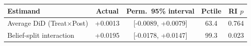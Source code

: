 \begin{tabular}{lcccc}
\toprule
Estimand & Actual & Perm.\ 95\% interval & Pctile & RI $p$ \\
\midrule
Average DiD (Treat$\times$Post) & +0.0013 & [-0.0089, +0.0079] & 63.4 & 0.764 \\
Belief-split interaction & +0.0195 & [-0.0178, +0.0147] & 99.3 & 0.023 \\
\bottomrule
\end{tabular}
